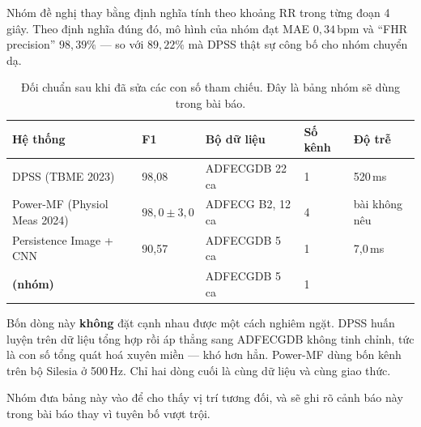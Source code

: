 Nhóm đề nghị thay bằng định nghĩa tính theo khoảng RR trong từng đoạn 4 giây. Theo định nghĩa đúng đó,
mô hình của nhóm đạt MAE $0{,}34$\,bpm và ``FHR precision'' $98{,}39\%$ --- so với $89{,}22\%$ mà DPSS
thật sự công bố cho nhóm chuyển dạ.

\begin{table}[H]\centering\small
\caption{Đối chuẩn sau khi đã sửa các con số tham chiếu. Đây là bảng nhóm sẽ dùng trong bài báo.}
\label{tab:doichuan_sua}
\begin{tabular}{@{}L{4.6cm} C{2.5cm} C{2.4cm} C{2.2cm} C{2.4cm}@{}}
\toprule
\textbf{Hệ thống} & \textbf{F1} & \textbf{Bộ dữ liệu} & \textbf{Số kênh} & \textbf{Độ trễ} \\
\midrule
DPSS (TBME 2023) & 98,08 & ADFECGDB 22 ca & 1 & 520\,ms \\
Power-MF (Physiol Meas 2024) & $98{,}0 \pm 3{,}0$ & ADFECG B2, 12 ca & 4 & bài không nêu \\
Persistence Image + CNN & 90,57 & ADFECGDB 5 ca & 1 & 7,0\,ms \\
\textbf{\mh{} (nhóm)} &  & ADFECGDB 5 ca & 1 &  \\
\bottomrule
\end{tabular}
\end{table}

\begin{canhbao}[title={Cách đọc bảng \ref{tab:doichuan_sua} cho đúng}]
Bốn dòng này \textbf{không} đặt cạnh nhau được một cách nghiêm ngặt. DPSS huấn luyện trên dữ liệu tổng
hợp rồi áp thẳng sang ADFECGDB không tinh chỉnh, tức là con số tổng quát hoá xuyên miền --- khó hơn
hẳn. Power-MF dùng bốn kênh trên bộ Silesia ở 500\,Hz. Chỉ hai dòng cuối là cùng dữ liệu và cùng giao thức.

Nhóm đưa bảng này vào để cho thấy vị trí tương đối, và sẽ ghi rõ cảnh báo này trong bài báo thay vì
tuyên bố vượt trội.
\end{canhbao}

\clearpage
